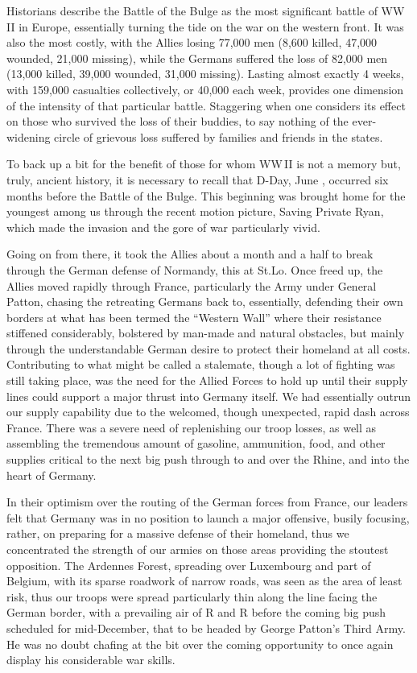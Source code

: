 \documentclass[../m3y]{subfiles}
\begin{document}
Historians describe the Battle of the Bulge as the most significant battle of WW\,II in Europe, essentially turning the tide on the war on the western front. It was also the most costly, with the Allies losing 77,000 men (8,600 killed, 47,000 wounded, 21,000 missing), while the Germans suffered the loss of 82,000 men (13,000 killed, 39,000 wounded, 31,000 missing). Lasting almost exactly 4 weeks, with 159,000 casualties collectively, or 40,000 each week, provides one dimension of the intensity of that particular battle. Staggering when one considers its effect on those who survived the loss of their buddies, to say nothing of the ever-widening circle of grievous loss suffered by families and friends in the states.

To back up a bit for the benefit of those for whom WW\,II is not a memory but, truly, ancient history, it is necessary to recall that D-Day, June , occurred six months before the Battle of the Bulge. This beginning was brought home for the youngest among us through the recent motion picture, Saving Private Ryan, which made the invasion and the gore of war particularly vivid.

Going on from there, it took the Allies about a month and a half to break through the German defense of Normandy, this at St.\@ Lo. Once freed up, the Allies moved rapidly through France, particularly the  Army under General Patton, chasing the retreating Germans back to, essentially, defending their own borders at what has been termed the ``Western Wall'' where their resistance stiffened considerably, bolstered by man-made and natural obstacles, but mainly through the understandable German desire to protect their homeland at all costs. Contributing to what might be called a stalemate, though a lot of fighting was still taking place, was the need for the Allied Forces to hold up until their supply lines could support a major thrust into Germany itself. We had essentially outrun our supply capability due to the welcomed, though unexpected, rapid dash across France. There was a severe need of replenishing our troop losses, as well as assembling the tremendous amount of gasoline, ammunition, food, and other supplies critical to the next big push through to and over the Rhine, and into the heart of Germany.

In their optimism over the routing of the German forces from France, our leaders felt that Germany was in no position to launch a major offensive, busily focusing, rather, on preparing for a massive defense of their homeland, thus we concentrated the strength of our armies on those areas providing the stoutest opposition. The Ardennes Forest, spreading over Luxembourg and part of Belgium, with its sparse roadwork of narrow roads, was seen as the area of least risk, thus our troops were spread particularly thin along the line facing the German border, with a prevailing air of R and R before the coming big push scheduled for mid-December, that to be headed by George Patton's Third Army. He was no doubt chafing at the bit over the coming opportunity to once again display his considerable war skills.
\end{document}
